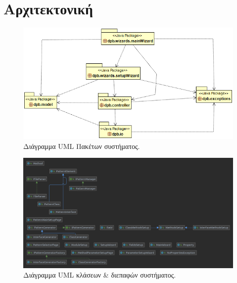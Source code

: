 \section{Αρχιτεκτονική}
\label{sec:packages}
\begin{figure}[H]
    \centering
    \includegraphics[width=1.0\textwidth]{Figures/packages.png}
    \caption{Διάγραμμα UML Πακέτων συστήματος.}
    \label{fig:packageUML}
\end{figure}
\begin{figure}[H]
    \centering
    \includegraphics[width=1.0\textwidth]{Figures/system.png}
    \caption{Διάγραμμα UML κλάσεων \& διεπαφών συστήματος.}
    \label{fig:systemUML}
\end{figure}

